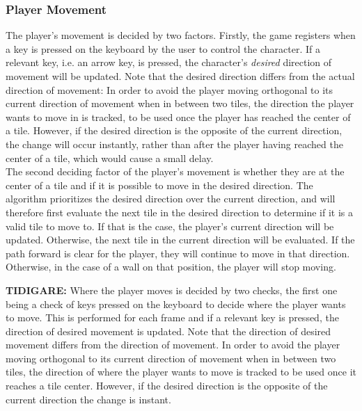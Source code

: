 \documentclass{article}
\begin{document}
  		\subsubsection{Player Movement}
        The player's movement is decided by two factors. Firstly, the game registers when a key is pressed on the keyboard by the user to control the character. If a relevant key, i.e. an arrow key, is pressed, the character's \textit{desired} direction of movement will be updated. Note that the desired direction differs from the actual direction of movement: In order to avoid the player moving orthogonal to its current direction of movement when in between two tiles, the direction the player wants to move in is tracked, to be used once the player has reached the center of a tile. However, if the desired direction is the opposite of the current direction, the change will occur instantly, rather than after the player having reached the center of a tile, which would cause a small delay. \\
        \newline
        The second deciding factor of the player's movement is whether they are at the center of a tile and if it is possible to move in the desired direction. The algorithm prioritizes the desired direction over the current direction, and will therefore first evaluate the next tile in the desired direction to determine if it is a valid tile to move to. If that is the case, the player's current direction will be updated. Otherwise, the next tile in the current direction will be evaluated. If the path forward is clear for the player, they will continue to move in that direction. Otherwise, in the case of a wall on that position, the player will stop moving. \\
        \newline

		\textbf{TIDIGARE:} Where the player moves is decided by two checks, the first one being a check of keys pressed on the keyboard to decide where the player wants to move. This is performed for each frame and if a relevant key is pressed, the direction of desired movement is updated. Note that the direction of desired movement differs from the direction of movement. In order to avoid the player moving orthogonal to its current direction of movement when in between two tiles, the direction of where the player wants to move is tracked to be used once it reaches a tile center. However, if the desired direction is the opposite of the current direction the change is instant.
\end{document}
